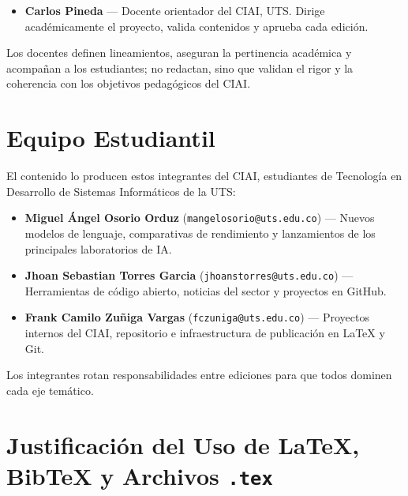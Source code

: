 \documentclass[conference,twocolumn,spanish]{IEEEtran}
\begin{document}
\begin{itemize}
  \item \textbf{Carlos Pineda} --- Docente orientador del CIAI, UTS\@.
        Dirige académicamente el proyecto, valida contenidos y aprueba
        cada edición.
\end{itemize}

Los docentes definen lineamientos, aseguran la pertinencia académica y
acompañan a los estudiantes; no redactan, sino que validan el rigor y la
coherencia con los objetivos pedagógicos del CIAI\@.

\section{Equipo Estudiantil}

El contenido lo producen estos integrantes del CIAI, estudiantes de
Tecnología en Desarrollo de Sistemas Informáticos de la UTS:

\begin{itemize}
  \item \textbf{Miguel Ángel Osorio Orduz}
        (\texttt{mangelosorio@uts.edu.co}) --- Nuevos modelos de
        lenguaje, comparativas de rendimiento y lanzamientos de los
        principales laboratorios de IA\@.

  \item \textbf{Jhoan Sebastian Torres Garcia}
        (\texttt{jhoanstorres@uts.edu.co}) --- Herramientas de código
        abierto, noticias del sector y proyectos en GitHub.

  \item \textbf{Frank Camilo Zuñiga Vargas}
        (\texttt{fczuniga@uts.edu.co}) --- Proyectos internos del CIAI,
        repositorio e infraestructura de publicación en \LaTeX{} y Git.
\end{itemize}

Los integrantes rotan responsabilidades entre ediciones para que todos
dominen cada eje temático.

\section{Justificación del Uso de \LaTeX{}, Bib\TeX{} y Archivos \texttt{.tex}}
\end{document}
